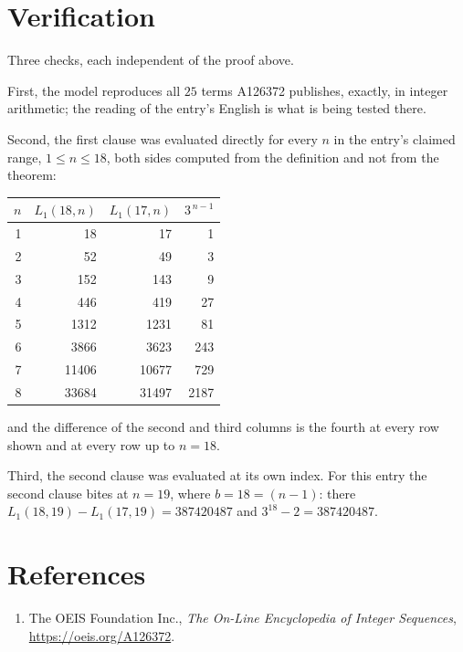 \documentclass[11pt,a4paper]{article}
\theoremstyle{plain}
\theoremstyle{definition}
\begin{document}
\section{Verification}

Three checks, each independent of the proof above.

First, the model reproduces all $25$ terms A126372 publishes, exactly, in integer
arithmetic; the reading of the entry's English is what is being tested there.

Second, the first clause was evaluated directly for every $n$ in the entry's claimed range,
$1\le n\le18$, both sides computed from the definition and not from the theorem:

\begin{center}
\begin{tabular}{rrrr}
$n$ & $L_{1}(18,n)$ & $L_{1}(17,n)$ & $3^{\,n-1}$ \\ \hline
1 & 18 & 17 & 1 \\
2 & 52 & 49 & 3 \\
3 & 152 & 143 & 9 \\
4 & 446 & 419 & 27 \\
5 & 1312 & 1231 & 81 \\
6 & 3866 & 3623 & 243 \\
7 & 11406 & 10677 & 729 \\
8 & 33684 & 31497 & 2187 \\
\end{tabular}
\end{center}

\noindent and the difference of the second and third columns is the fourth at every row shown
and at every row up to $n=18$.

Third, the second clause was evaluated at its own index. For this entry the second clause bites at $n=19$, where $b=18=(n-1)$: there $L_{1}(18,19)-L_{1}(17,19)=387420487$ and $3^{18}-2=387420487$.

\section*{References}
\begin{enumerate}
\item The OEIS Foundation Inc., \emph{The On-Line Encyclopedia of Integer Sequences},
\url{https://oeis.org/A126372}.
\end{enumerate}
\end{document}
